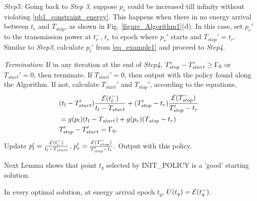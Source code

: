 \textit{Step5:} Going back to \textit{Step 3}, suppose $p_r$ could be increased till infinity without violating \eqref{pb1_constraint_energy}. This happens when there in no energy arrival between $t_r$ and $T_{stop}$, as shown in Fig. \ref{figure_Algorithm1}(d). In this case, set $p_r'$ to the transmission power at $t_r^-$, $t_r$ to epoch where $p_r'$ starts and $T_{stop}'=t_r$. Similar to \textit{Step3}, calculate $p_l'$ from \eqref{eq_example1} and proceed to \textit{Step4}. 

\textit{Termination}: If in any iteration at the end of \textit{Step4}, $T_{stop}' - T_{start}' \ge \Gamma_0$ or $T_{start}' = 0$, then terminate. If $T_{start}' = 0$, then output with the policy found along the Algorithm. If not, calculate $T_{start}'$ and $T_{stop}'$, according to the equations,
\begin{align}
&\nonumber (t_l-T_{start}')\frac{\ETx(t_l^-)}{t_l-T_{start}}+(T_{stop}'-t_r)\frac{\ETx(T_{stop}^-)}{T_{stop}'-t_r}\\
&=g(p_l)(t_l-T_{start})+g(p_r)(T_{stop}-t_r)\\
&T_{stop}'-T_{start}'=\TRx_0.
\end{align}
Update $p_l'=\frac{\mathcal{E}(t_l^-)}{t_l-T_{start}}$, $p_r'=\frac{\mathcal{E}(T_{stop}^-)}{T_{stop}'-t_r}$. Output with this policy. 

Next Lemma shows that point $t_q$ selected by INIT\_POLICY is a 'good' starting solution.
\begin{lemma}
In every optimal solution, at energy arrival epoch $t_q$, $U(t_q)=\mathcal{E}(t_q^-)$.
\label{lemma_Q}
\end{lemma}

